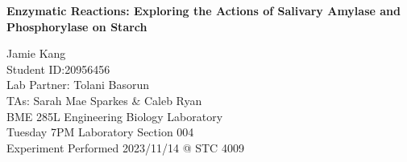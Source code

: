 \begin{titlepage}
    \begin{center}
        \vspace*{2in}
        \textbf{Enzymatic Reactions: Exploring the Actions of Salivary Amylase and Phosphorylase on Starch}
 
        \vspace{0.5in}
        Jamie Kang\\
        Student ID:\@ 20956456\\
        Lab Partner: Tolani Basorun\\
        TAs: Sarah Mae Sparkes \& Caleb Ryan\\
        BME 285L Engineering Biology Laboratory\\
        Tuesday 7PM Laboratory Section 004\\
        Experiment Performed 2023/11/14 @ STC 4009\\
             
    \end{center}
 \end{titlepage}